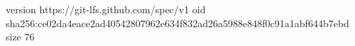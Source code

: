 version https://git-lfs.github.com/spec/v1
oid sha256:ce02da4eace2ad40542807962e634f832ad26a5988e848f0c91a1abf644b7ebd
size 76
